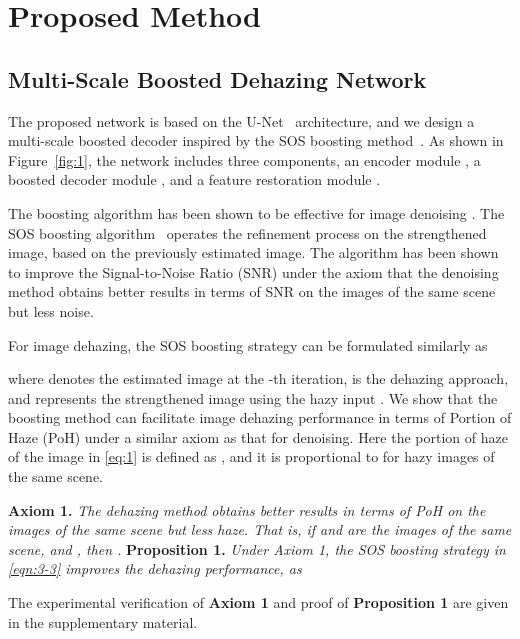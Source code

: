 \documentclass[10pt,twocolumn,letterpaper]{article}
\newcommand{\figref}[1]{Figure~\ref{fig:#1}}
\begin{document}
   \vspace{-2mm}
   \section{Proposed Method}
   \label{sec:3}
  \vspace{-1mm}
  \subsection{Multi-Scale Boosted Dehazing Network}
  \label{sec:3.1}
  \vspace{-1mm}
The proposed network is based on the U-Net~\cite{UNet} architecture, and we design a multi-scale boosted decoder inspired by the SOS boosting method~\cite{SOS}.
As shown in \figref{1}, the network includes three components, an encoder module , a boosted decoder module , and a feature restoration module .


The boosting algorithm has been shown to be effective for image denoising \cite{TwicingBoosting, DiffusionBoosting, SOS}.
The SOS boosting algorithm~\cite{SOS} operates the refinement process on the strengthened image, based on the previously estimated image.
The algorithm has been shown to improve the Signal-to-Noise Ratio (SNR) under the axiom that the denoising method obtains better results in terms of SNR on the images of the same scene but less noise.
  
  For image dehazing, the SOS boosting strategy can be formulated similarly as
  
  where  denotes the estimated image at the -th iteration,  is the dehazing approach, and  represents the strengthened image using the hazy input .
We show that the boosting method can facilitate image dehazing performance in terms of Portion of Haze (PoH) under a similar axiom as that for denoising.
Here the portion of haze of the image  in \eqref{eq:1} is defined as , and it is proportional to  for hazy images of the same scene.
  
  \vspace{-2mm}
  {\flushleft \bf Axiom 1.}
  \emph{The dehazing method  obtains better results in terms of PoH on the images of the same scene but less haze. That is, if  and  are the images of the same scene, and , then .}
  {\flushleft \bf Proposition 1.}
  \emph{Under Axiom 1, the SOS boosting strategy in \eqref{eqn:3-3} improves the dehazing performance, as}
  
  The experimental verification of \textbf{Axiom 1} and proof of \textbf{Proposition 1} are given in the supplementary material.
\end{document}
